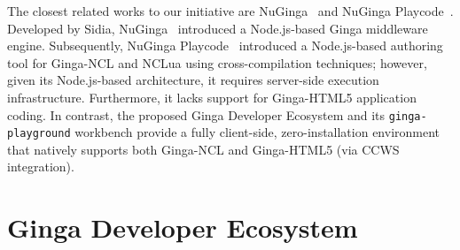 \documentclass[sigconf,authorversion,review,authordraft]{webmedia}
\begin{document}
The closest related works to our initiative are NuGinga~\cite{nuginga18} and NuGinga Playcode~\cite{nuginga_playcode20}. Developed by Sidia, NuGinga~\cite{nuginga18} introduced a Node.js-based Ginga middleware engine. Subsequently, NuGinga Playcode~\cite{nuginga_playcode20} introduced a Node.js-based authoring tool for Ginga-NCL and NCLua using cross-compilation techniques; however, given its Node.js-based architecture, it requires server-side execution infrastructure. Furthermore, it lacks support for Ginga-HTML5 application coding. In contrast, the proposed Ginga Developer Ecosystem and its \texttt{ginga-playground} workbench provide a fully client-side, zero-installation environment that natively supports both Ginga-NCL and Ginga-HTML5 (via CCWS integration).

\section{Ginga Developer Ecosystem} \label{sec:ecosystem}
\end{document}
